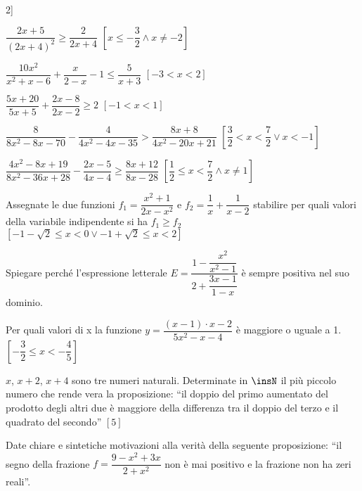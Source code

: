 \begin{esercizio}[\Ast]
\begin{enumeratea}
2\right]\)
\item \(\dfrac{2x+5}{(2x+4)^2}\ge \dfrac 2{2x+4}\) 
 \hfill \(\left[x\le -\dfrac 3 2 \wedge x \neq -2\right]\)
\item \(\dfrac{10x^2}{x^2+x-6}+\dfrac x{2-x}-1\le \dfrac 5{x+3}\) 
 \hfill \(\left[-3<x<2\right]\)
\item \(\dfrac{5x+20}{5x+5}+\dfrac{2x-8}{2x-2}\ge 2\) 
 \hfill \(\left[-1<x<1\right]\)
\item \(\dfrac 8{8x^2-8x-70}-\dfrac 4{4x^2-4x-35}>\dfrac{8x+8}{4x^2-20x+21}\)
 \hfill \(\left[\dfrac 3 2<x<\dfrac 7 2\vee x<-1\right]\)
\item \(\dfrac{4x^2-8x+19}{8x^2-36x+28}-\dfrac{2x-5}{4x-4}\ge 
\dfrac{8x+12}{8x-28}\)
 \hfill \(\left[\dfrac 1 2\le x<\dfrac 7 2 \wedge x \neq 1\right]\)
\end{enumeratea}
\end{esercizio}

\begin{esercizio}[\Ast]
 \label{ese:4.68}
Assegnate le due funzioni \(f_1=\dfrac{x^2+1}{2x-x^2}\) e \(f_2=\dfrac 1 
x+\dfrac 
1{x-2}\) stabilire per quali valori della variabile indipendente si ha 
\(f_1\ge 
f_2\)
 \hfill \(\left[-1-\sqrt 2\le x<0\vee -1+\sqrt 2\le x<2\right]\)
\end{esercizio}

\begin{esercizio}
 \label{ese:4.69}
Spiegare perché l'espressione letterale 
\(E=\dfrac{1-\dfrac{x^2}{x^2-1}}{2+\dfrac{3x-1}{1-x}}\) è sempre positiva nel 
suo 
dominio.
\end{esercizio}

\begin{esercizio}[\Ast]
 \label{ese:4.70}
Per quali valori di x la funzione \(y=\dfrac{(x-1)\cdot x-2}{5x^2-x-4}\) è 
maggiore 
o uguale a 1.
 \hfill \(\left[-\dfrac 3 2\le x<-\dfrac 4 5\right]\)
\end{esercizio}

\begin{esercizio}[\Ast]
 \label{ese:4.71}
\( x \), \( x+2 \), \( x+4 \) sono tre numeri naturali. Determinate in \( 
\insN \) il 
più piccolo numero che rende vera la proposizione: ``il doppio del primo 
aumentato del prodotto degli altri due è maggiore della differenza tra il 
doppio 
del terzo e il quadrato del secondo''
 \hfill \(\left[5\right]\)
\end{esercizio}

\begin{esercizio}
 \label{ese:4.72}
Date chiare e sintetiche motivazioni alla verità della seguente proposizione: 
``il segno della frazione \(f=\dfrac{9-x^2+3x}{2+x^2}\) non è mai positivo e 
la 
frazione non ha zeri reali''.
\end{esercizio}

